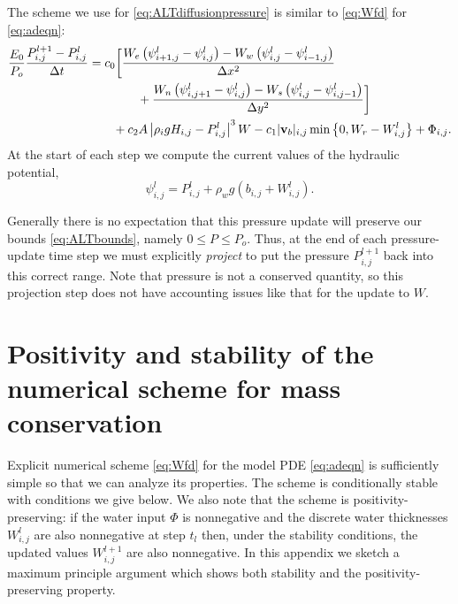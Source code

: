 \documentclass[12pt,final]{amsart}%
\newcommand\bv{\mathbf{v}}
\newcommand{\Wlij}{W^l_{i,j}}
\newcommand{\Plij}{P^l_{i,j}}
\begin{document}
The scheme we use for \eqref{eq:ALTdiffusionpressure} is similar to \eqref{eq:Wfd} for \eqref{eq:adeqn}:
\begin{align}
\frac{E_0}{P_o} \frac{P_{i,j}^{l+1} - \Plij}{\Delta t} &= c_0 \bigg[\frac{W_e \left(\psi_{i+1,j}^l - \psi_{i,j}^l\right) - W_w \left(\psi_{i,j}^l - \psi_{i-1,j}^l\right)}{\Delta x^2}  \label{eq:Pfd} \\
      &\qquad\qquad + \frac{W_n \left(\psi_{i,j+1}^l - \psi_{i,j}^l\right) - W_s \left(\psi_{i,j}^l - \psi_{i,j-1}^l\right)}{\Delta y^2}\bigg] \notag \\
      &\qquad + c_2 A \left|\rho_i g H_{i,j} - \Plij\right|^3 W - c_1 |\bv_b|_{i,j} \min\left\{0,W_r - \Wlij\right\} + \Phi_{i,j}. \notag
\end{align}
At the start of each step we compute the current values of the hydraulic potential,
	$$\psi_{i,j}^l = \Plij + \rho_w g(b_{i,j} + \Wlij).$$

Generally there is no expectation that this pressure update will preserve our bounds \eqref{eq:ALTbounds}, namely $0\le P \le P_o$.  Thus, at the end of each pressure-update time step we must explicitly \emph{project} to put the pressure $P_{i,j}^{l+1}$ back into this correct range.  Note that pressure is not a conserved quantity, so this projection step does not have accounting issues like that for the update to $W$.


\small



\small
\appendix

\section{Positivity and stability of the numerical scheme for mass conservation}

Explicit numerical scheme \eqref{eq:Wfd} for the model PDE \eqref{eq:adeqn} is sufficiently simple so that we can analyze its properties.  The scheme is conditionally stable with conditions we give below.  We also note that the scheme is positivity-preserving: if the water input $\Phi$ is nonnegative and the discrete water thicknesses $\Wlij$ are also nonnegative at step $t_l$ then, under the stability conditions, the updated values $W_{i,j}^{l+1}$ are also nonnegative.  In this appendix we sketch a maximum principle argument \citep{MortonMayers} which shows both stability and the positivity-preserving property.
\end{document}
